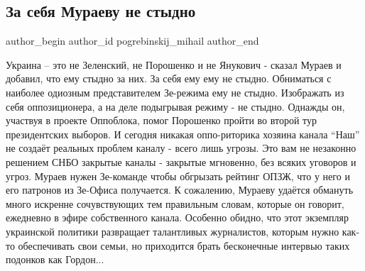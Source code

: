  
 
 
 
 
 
\subsection{За себя Мураеву не стыдно}
\label{sec:04_01_2022.fb.pogrebinskij_mihail.1.muraev}
 
\ifcmt
 author_begin
   author_id pogrebinskij_mihail
 author_end
\fi

Украина – это не Зеленский, не Порошенко и не Янукович - сказал Мураев и
добавил, что ему стыдно за них. За себя ему ему не стыдно. Обниматься с
наиболее одиозным представителем Зе-режима ему не стыдно. Изображать из себя
оппозиционера, а на деле подыгрывая режиму - не стыдно. Однажды он, участвуя в
проекте Оппоблока, помог Порошенко пройти во второй тур президентских выборов.
И сегодня никакая оппо-риторика хозяина канала \enquote{Наш} не создаёт реальных
проблем каналу - всего лишь угрозы. Это вам не незаконно решением СНБО закрытые
каналы - закрытые мгновенно, без всяких уговоров и угроз. Мураев нужен
Зе-команде чтобы обгрызать рейтинг ОПЗЖ, что у него и его патронов из Зе-Офиса
получается. К сожалению, Мураеву удаётся обмануть много искренне сочувствующих
тем правильным словам, которые он говорит, ежедневно в эфире собственного
канала. Особенно обидно, что этот экземпляр украинской политики развращает
талантливых журналистов, которым нужно как-то обеспечивать свои семьи, но
приходится  брать бесконечные интервью таких подонков как Гордон...


